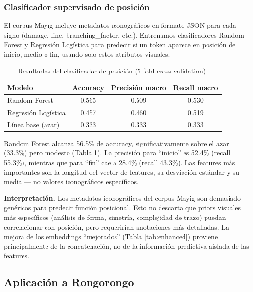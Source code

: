 \documentclass[11pt,a4paper]{article}
\newcommand{\1}{\mathbf{1}}
\numberwithin{equation}{section}
\begin{document}
\subsubsection{Clasificador supervisado de posición}

El corpus Mayig incluye metadatos iconográficos en formato JSON para cada signo (damage, line, branching\_factor, etc.). Entrenamos clasificadores Random Forest y Regresión Logística para predecir si un token aparece en posición de inicio, medio o fin, usando solo estos atributos visuales.

\begin{table}[h]
\centering
\caption{Resultados del clasificador de posición (5-fold cross-validation).}
\label{tab:position_classifier}
\begin{tabular}{lccc}
\toprule
Modelo & Accuracy & Precisión macro & Recall macro \\
\midrule
Random Forest & 0.565 & 0.509 & 0.530 \\
Regresión Logística & 0.457 & 0.460 & 0.519 \\
Línea base (azar) & 0.333 & 0.333 & 0.333 \\
\bottomrule
\end{tabular}
\end{table}

Random Forest alcanza 56.5\% de accuracy, significativamente sobre el azar (33.3\%) pero modesto (Tabla \ref{tab:position_classifier}). La precisión para ``inicio'' es 52.4\% (recall 55.3\%), mientras que para ``fin'' cae a 28.4\% (recall 43.3\%). Las features más importantes son la longitud del vector de features, su desviación estándar y su media --- no valores iconográficos específicos.

\textbf{Interpretación.} Los metadatos iconográficos del corpus Mayig son demasiado genéricos para predecir función posicional. Esto no descarta que priors visuales más específicos (análisis de forma, simetría, complejidad de trazo) puedan correlacionar con posición, pero requerirían anotaciones más detalladas. La mejora de los embeddings ``mejorados'' (Tabla \ref{tab:enhanced}) proviene principalmente de la concatenación, no de la información predictiva aislada de las features.

\subsection{Aplicación a Rongorongo}
\end{document}
